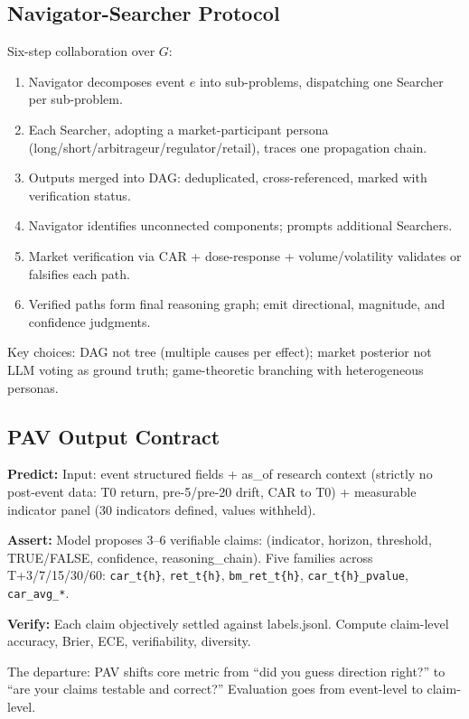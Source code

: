 \documentclass[sigconf, anonymous, review]{acmart}
\begin{document}
\subsection{Navigator-Searcher Protocol}

Six-step collaboration over $G$:
\begin{enumerate}
    \item Navigator decomposes event $e$ into sub-problems, dispatching one Searcher per sub-problem.
    \item Each Searcher, adopting a market-participant persona (long/short/arbitrageur/regulator/retail), traces one propagation chain.
    \item Outputs merged into DAG: deduplicated, cross-referenced, marked with verification status.
    \item Navigator identifies unconnected components; prompts additional Searchers.
    \item Market verification via CAR + dose-response + volume/volatility validates or falsifies each path.
    \item Verified paths form final reasoning graph; emit directional, magnitude, and confidence judgments.
\end{enumerate}

Key choices: DAG not tree (multiple causes per effect); market posterior not LLM voting as ground truth; game-theoretic branching with heterogeneous personas.

\subsection{PAV Output Contract}

\textbf{Predict:} Input: event structured fields + as\_of research context (strictly no post-event data: T0 return, pre-5/pre-20 drift, CAR to T0) + measurable indicator panel (30 indicators defined, values withheld).

\textbf{Assert:} Model proposes 3--6 verifiable claims: (indicator, horizon, threshold, TRUE/FALSE, confidence, reasoning\_chain). Five families across T+3/7/15/30/60: \texttt{car\_t\{h\}}, \texttt{ret\_t\{h\}}, \texttt{bm\_ret\_t\{h\}}, \texttt{car\_t\{h\}\_pvalue}, \texttt{car\_avg\_*}.

\textbf{Verify:} Each claim objectively settled against labels.jsonl. Compute claim-level accuracy, Brier, ECE, verifiability, diversity.

The departure: PAV shifts core metric from ``did you guess direction right?'' to ``are your claims testable and correct?'' Evaluation goes from event-level to claim-level.
\end{document}
